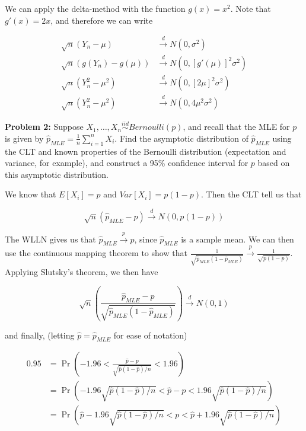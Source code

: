 \documentclass[
  letterpaper,
  DIV=11,
  numbers=noendperiod]{scrreprt}
\begin{document}
We can apply the delta-method with the function \(g(x) = x^2\). Note
that \(g'(x) = 2x\), and therefore we can write

\begin{align*}
    \sqrt{n}(Y_n - \mu) & \overset{d}{\to} N(0, \sigma^2) \\
    \sqrt{n}(g(Y_n) - g(\mu)) & \overset{d}{\to} N(0, [g'(\mu)]^2\sigma^2) \\
    \sqrt{n}(Y_n^2 - \mu^2) & \overset{d}{\to} N(0, [2\mu]^2\sigma^2) \\
    \sqrt{n}(Y_n^2 - \mu^2) & \overset{d}{\to} N(0, 4 \mu^2\sigma^2)
\end{align*}

\textbf{Problem 2:} Suppose
\(X_1, \dots, X_n \overset{iid}{\sim} Bernoulli(p)\), and recall that
the MLE for \(p\) is given by
\(\hat{p}_{MLE} = \frac{1}{n} \sum_{i = 1}^n X_i\). Find the asymptotic
distribution of \(\hat{p}_{MLE}\) using the CLT and known properties of
the Bernoulli distribution (expectation and variance, for example), and
construct a 95\% confidence interval for \(p\) based on this asymptotic
distribution.

We know that \(E[X_i] = p\) and \(Var[X_i] = p(1-p)\). Then the CLT tell
us that

\[
\sqrt{n}(\hat{p}_{MLE} - p) \overset{d}{\to} N(0, p(1-p))
\]

The WLLN gives us that \(\hat{p}_{MLE} \overset{p}{\to} p\), since
\(\hat{p}_{MLE}\) is a sample mean. We can then use the continuous
mapping theorem to show that
\(\frac{1}{\sqrt{\hat{p}_{MLE}(1-\hat{p}_{MLE})}} \overset{p}{\to} \frac{1}{\sqrt{p(1 - p)}}\).
Applying Slutsky's theorem, we then have

\[
\sqrt{n}\left(\frac{\hat{p}_{MLE} - p}{\sqrt{\hat{p}_{MLE}(1-\hat{p}_{MLE})}}\right) \overset{d}{\to} N(0, 1)
\]

and finally, (letting \(\hat{p} = \hat{p}_{MLE}\) for ease of notation)

\begin{align*}
    0.95 & = \Pr\left(-1.96 < \frac{\hat{p} - p}{\sqrt{\hat{p}(1-\hat{p})/n}}  < 1.96\right)  \\
    & = \Pr\left(-1.96\sqrt{\hat{p}(1-\hat{p})/n} < \hat{p} - p  < 1.96\sqrt{\hat{p}(1-\hat{p})/n}\right) \\
    & = \Pr\left(\hat{p} -1.96\sqrt{\hat{p}(1-\hat{p})/n} <  p  < \hat{p} + 1.96\sqrt{\hat{p}(1-\hat{p})/n}\right)
\end{align*}

\end{document}
